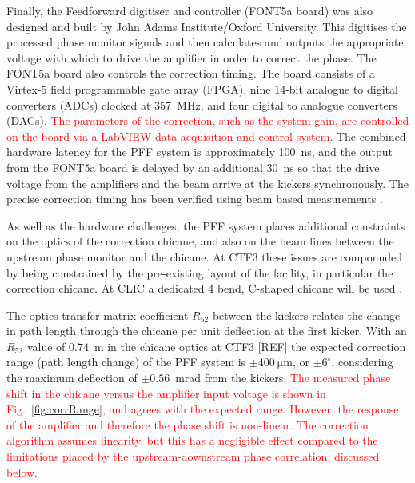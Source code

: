 \documentclass[%
 reprint,
superscriptaddress,
 amsmath,amssymb,
 prl,
]{revtex4-1}
\begin{document}
Finally, the Feedforward digitiser and controller (FONT5a board) 
\cite{RobertsThesis} was also 
designed and built by John Adams Institute/Oxford University. This digitises 
the processed phase monitor signals and then calculates and outputs the 
appropriate voltage with which to drive the amplifier in order to correct the 
phase. The FONT5a board also controls the correction 
timing. The board consists of a Virtex-5 field programmable gate array (FPGA), 
nine 14-bit analogue to digital converters (ADCs) clocked at 357~MHz, and four 
digital to analogue converters (DACs). \textcolor{red}{The parameters of the 
correction, such 
as the system gain, are controlled on the board via a LabVIEW data 
acquisition and control system.} The combined hardware latency for the PFF 
system is approximately 
100~ns, and the output from the FONT5a board is delayed by an additional 30~ns 
so that the drive voltage from the amplifiers and the beam arrive at the 
kickers synchronously. The precise correction timing has been verified using 
beam based measurements \cite{RobertsThesis}.

As well as the hardware challenges, the PFF system places additional 
constraints on the optics of the correction 
chicane, and also on the beam lines between the upstream phase monitor and the 
chicane. At CTF3 these issues are compounded by being constrained by the 
pre-existing layout of the facility, in particular the correction chicane. At 
CLIC a dedicated 4 bend, C-shaped chicane will be used \cite{CLICCDR}.

The optics transfer matrix coefficient \(R_{52}\) between the kickers relates 
the change in path length through the chicane per unit 
deflection at the first kicker. 
With an \(R_{52}\) value of \(0.74\)~m in the chicane optics at 
CTF3 [REF] the expected correction range (path length change) of the PFF system 
is \(\pm400~\mathrm{\mu m}\), or \(\pm6^\circ\), considering the maximum 
deflection of \(\pm0.56\)~mrad from the kickers.
\textcolor{red}{The measured phase shift in the chicane versus the amplifier 
input voltage is 
shown in Fig.~\ref{fig:corrRange}, and agrees with the expected range. 
However, the response of the amplifier and therefore the phase shift is 
non-linear. The correction algorithm assumes linearity, but this has a 
negligible effect compared to the limitations placed by the
upstream-downstream phase correlation, discussed below.}
\end{document}
